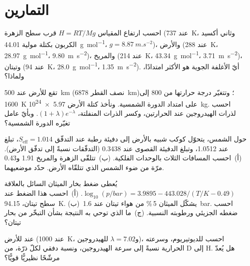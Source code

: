 \section{التمارين}

\begin{exercise}[$\star$]\label{exo:b3:planetary-atmospheres:1}
احسب ارتفاع المقياس $H = RT/Mg$ قرب سطح الزهرة
(عند \qty{737}{K}، وثاني أكسيد الكربون بكتلة مولية \qty{44.01}{g.mol^{-1}}،
$g = \qty{8.87}{m.s^{-2}}$)، والأرض (عند \qty{288}{K}،
\qty{28.97}{g.mol^{-1}}، \qty{9.80}{m.s^{-2}})، والمريخ (عند \qty{214}{K}،
\qty{43.34}{g.mol^{-1}}، \qty{3.71}{m.s^{-2}})، وتيتان (عند \qty{94}{K}،
\qty{28.0}{g.mol^{-1}}، \qty{1.35}{m.s^{-2}}). أيّ الأغلفة الجوية هو الأكثر
امتدادًا، ولماذا؟
\end{exercise}

\begin{exercise}[$\star$]\label{exo:b3:planetary-atmospheres:2}
تقع  للأرض عند \qty{500}{km} (نصف القطر \qty{6878}{km})؛ وتتغيّر
درجة حرارتها من 800 إلى \qty{1600}{K} على امتداد الدورة الشمسية. ونأخذ
كتلة الأرض \qty{5.97e24}{kg}. احسب  لذرات الهيدروجين عند الحرارتين،
وكسر الذرات المنفلتة،
$(1 + \lambda)e^{-\lambda}$. وبأيّ عامل تغيّره الدورة الشمسية؟
\end{exercise}

\begin{exercise}[$\star$]\label{exo:b3:planetary-atmospheres:3}
حول الشمس، يتحوّل كوكب شبيه بالأرض إلى دفيئة رطبة عند التدفّق $S_\mathrm{eff}
= 1.014$، تبلغ  عند 1.0512، وتبلغ الدفيئة القصوى عند 0.3438
(التدفّقات نسبةً إلى تدفّق الأرض). (أ)~احسب المسافات الثلاث بالوحدات
الفلكية. (ب)~تتلقّى الزهرة والمريخ 1.91 و0.43 مرّة من ضوء الشمس الذي تتلقّاه الأرض.
حدّد موضعيهما.
\end{exercise}

\begin{exercise}[$\star$]\label{exo:b3:planetary-atmospheres:4}
يُعطى ضغط بخار الميثان السائل بالعلاقة $\log_{10}(p/\unit{bar}) = 3.9895 -
443.028/(T/\unit{K} - 0.49)$. (أ)~احسب هذا الضغط عند سطح تيتان،
\qty{94.15}{K}. (ب)~يشكّل الميثان 5\,\% من هواء تيتان عند \qty{1.6}{bar}.
احسب ضغطه الجزيئي ورطوبته النسبية. (ج)~ما الذي توحي به النتيجة
بشأن التبخّر من بحار تيتان؟
\end{exercise}

\begin{exercise}[$\star\star$]\label{exo:b3:planetary-atmospheres:5}
عند  للأرض (عند \qty{1000}{K}، و$\lambda = 7.02$ للهيدروجين)،
احسب  للديوتيريوم، وسرعته الحرارية نسبةً إلى سرعة الهيدروجين،
ونسبة دفقي  لكلّ ذرّة، من D إلى H. هل يُعدّ 
مرشّحًا نظيريًّا قويًّا؟
\end{exercise}

